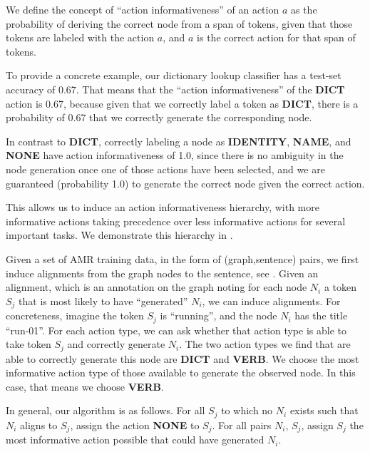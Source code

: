 \documentclass[11pt]{article}
\begin{document}

We define the concept of ``action informativeness'' of an action $a$ as the probability of deriving the correct node from a span of tokens, given that those tokens are labeled with the action $a$, and $a$ is the correct action for that span of tokens.

To provide a concrete example, our dictionary lookup classifier has a test-set accuracy of 0.67. That means that the ``action informativeness'' of the \textbf{DICT} action is 0.67, because given that we correctly label a token as \textbf{DICT}, there is a probability of 0.67 that we correctly generate the corresponding node.

In contrast to \textbf{DICT}, correctly labeling a node as \textbf{IDENTITY}, \textbf{NAME}, and \textbf{NONE} have action informativeness of 1.0, since there is no ambiguity in the node generation once one of those actions have been selected, and we are guaranteed (probability 1.0) to generate the correct node given the correct action.


This allows us to induce an action informativeness hierarchy, with more informative actions taking precedence over less informative actions for several important tasks. We demonstrate this hierarchy in .


Given a set of AMR training data, in the form of (graph,sentence) pairs, we first induce alignments from the graph nodes to the sentence, see . Given an alignment, which is an annotation on the graph noting for each node $N_i$ a token $S_j$ that is most likely to have ``generated'' $N_i$, we can induce alignments. For concreteness, imagine the token $S_j$ is ``running'', and the node $N_i$ has the title ``run-01''. For each action type, we can ask whether that action type is able to take token $S_j$ and correctly generate $N_i$. The two action types we find that are able to correctly generate this node are \textbf{DICT} and \textbf{VERB}. We choose the most informative action type of those available to generate the observed node. In this case, that means we choose \textbf{VERB}.

In general, our algorithm is as follows. For all $S_j$ to which no $N_i$ exists such that $N_i$ aligns to $S_j$, assign the action \textbf{NONE} to $S_j$. For all pairs $N_i$, $S_j$, assign $S_j$ the most informative action possible that could have generated $N_i$. 
\end{document}
